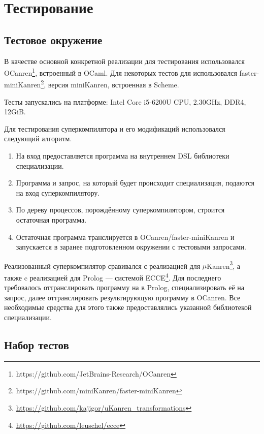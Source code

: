 \section{Тестирование}
\label{sec:testing}

\subsection{Тестовое окружение}

В качестве основной конкретной реализации \ukanren для тестирования
использовался OCanren\footnote{https://github.com/JetBrains-Research/OCanren}\cite{ocanren},
встроенный в OCaml\cite{ocanren}.
Для некоторых тестов для использовался faster-miniKanren\footnote{https://github.com/miniKanren/faster-miniKanren},
версия miniKanren, встроенная в Scheme.

Тесты запускались на платформе: Intel Core i5-6200U CPU, 2.30GHz, DDR4, 12GiB.

Для тестирования суперкомпилятора и его модификаций использовался следующий алгоритм.
\begin{enumerate}
\item На вход предоставляется программа на внутреннем DSL \ukanren библиотеки специализации.
\item Программа и запрос, на который будет происходит специализация, подаются на вход суперкомпилятору.
\item По дереву процессов, порождённому суперкомпилятором, строится остаточная программа.
\item Остаточная программа транслируется в OCanren/faster-miniKanren и
      запускается в заранее подготовленном окружении с тестовыми запросами.
\end{enumerate}


Реализованный суперкомпилятор сравивался с реализацией \forcpd для $\mu$Kanren\footnote{\url{https://github.com/kajigor/uKanren_transformations}},
а также c реализацией \forcpd для Prolog --- системой ECCE\footnote{\url{https://github.com/leuschel/ecce}}.
Для последнего требовалось оттранслировать программу на \ukanren в Prolog, специализировать
её на запрос, далее оттранслировать результирующую программу в OCanren. Все необходимые средства
для этого также предоставлялись указанной библиотекой специализации.

\subsection{Набор тестов}

